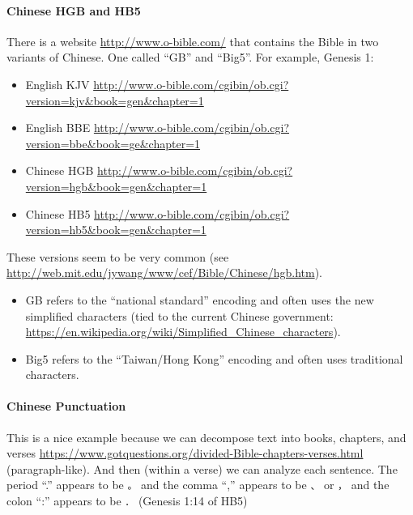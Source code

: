\documentclass[
]{article}
\providecommand{\tightlist}{%
  \setlength{\itemsep}{0pt}\setlength{\parskip}{0pt}}
\begin{document}
\hypertarget{chinese-hgb-and-hb5}{%
\paragraph{Chinese HGB and HB5}\label{chinese-hgb-and-hb5}}

There is a website \url{http://www.o-bible.com/} that contains the Bible
in two variants of Chinese. One called ``GB'' and ``Big5''. For example,
Genesis 1:

\begin{itemize}
\tightlist
\item
  English KJV
  \url{http://www.o-bible.com/cgibin/ob.cgi?version=kjv\&book=gen\&chapter=1}
\item
  English BBE
  \url{http://www.o-bible.com/cgibin/ob.cgi?version=bbe\&book=ge\&chapter=1}
\item
  Chinese HGB
  \url{http://www.o-bible.com/cgibin/ob.cgi?version=hgb\&book=gen\&chapter=1}
\item
  Chinese HB5
  \url{http://www.o-bible.com/cgibin/ob.cgi?version=hb5\&book=gen\&chapter=1}
\end{itemize}

These versions seem to be very common (see
\url{http://web.mit.edu/jywang/www/cef/Bible/Chinese/hgb.htm}).

\begin{itemize}
\tightlist
\item
  GB refers to the ``national standard'' encoding and often uses the new
  simplified characters (tied to the current Chinese government:
  \url{https://en.wikipedia.org/wiki/Simplified_Chinese_characters}).
\item
  Big5 refers to the ``Taiwan/Hong Kong'' encoding and often uses
  traditional characters.
\end{itemize}

\hypertarget{chinese-punctuation}{%
\paragraph{Chinese Punctuation}\label{chinese-punctuation}}

This is a nice example because we can decompose text into books,
chapters, and verses
\url{https://www.gotquestions.org/divided-Bible-chapters-verses.html}
(paragraph-like). And then (within a verse) we can analyze each
sentence. The period ``.'' appears to be \texttt{。} and the comma ``,''
appears to be \texttt{、} or \texttt{，} and the colon ``:'' appears to
be \texttt{．} (Genesis 1:14 of HB5)
\end{document}
